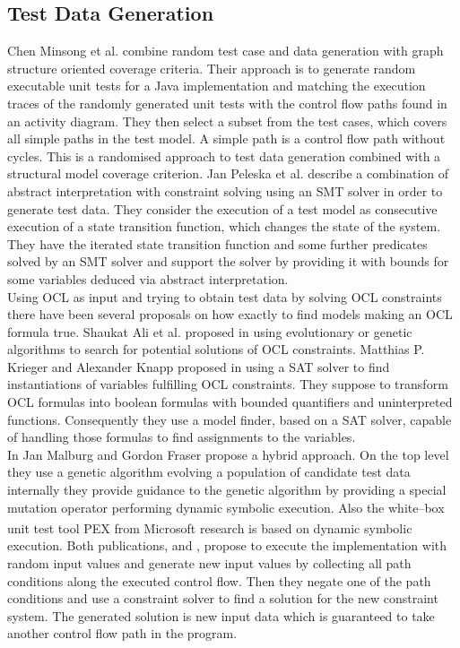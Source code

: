 \subsection{Test Data Generation}
Chen Minsong et al. \cite{mingsong2006automatic} combine random test case and data generation with graph structure oriented coverage criteria. Their approach is to generate random executable unit tests for a Java implementation and matching the execution traces of the randomly generated unit tests with the control flow paths found in an activity diagram. They then select a subset from the test cases, which covers all simple paths in the test model. A simple path is a control flow path without cycles. This is a randomised approach to test data generation combined with a structural model coverage criterion.
Jan Peleska et al. \cite{peleska2011automated} describe a combination of abstract interpretation with constraint solving using an SMT solver in order to generate test data. They consider the execution of a test model as consecutive execution of a state transition function, which changes the state of the system. They have the iterated state transition function and some further predicates solved by an SMT solver and support the solver by providing it with bounds for some variables deduced via abstract interpretation.\\
Using OCL as input and trying to obtain test data by solving OCL constraints there have been several proposals on how exactly to find models making an OCL formula true. Shaukat Ali et al. proposed in \cite{ali2011search} using evolutionary or genetic algorithms to search for potential solutions of OCL constraints. Matthias P. Krieger and Alexander Knapp proposed in \cite{krieger2008executingUnderspecifiedOCL} using a SAT solver to find instantiations of variables fulfilling OCL constraints. They suppose to transform OCL formulas into boolean formulas with bounded quantifiers and uninterpreted functions. Consequently they use a model finder, based on a SAT solver, capable of handling those formulas to find assignments to the variables.\\
In \cite{malburg2011combining} Jan Malburg and Gordon Fraser propose a hybrid approach. On the top level they use a genetic algorithm evolving a population of candidate test data internally they provide guidance to the genetic algorithm by providing a special mutation operator performing dynamic symbolic execution. Also the white--box unit test tool PEX \cite{pex} from Microsoft\textsuperscript{\textregistered} research is based on dynamic symbolic execution. Both publications, \cite{malburg2011combining} and \cite{pex}, propose to execute the implementation with random input values and generate new input values by collecting all path conditions along the executed control flow. Then they negate one of the path conditions and use a constraint solver to find a solution for the new constraint system. The generated solution is new input data which is guaranteed to take another control flow path in the program.\\
